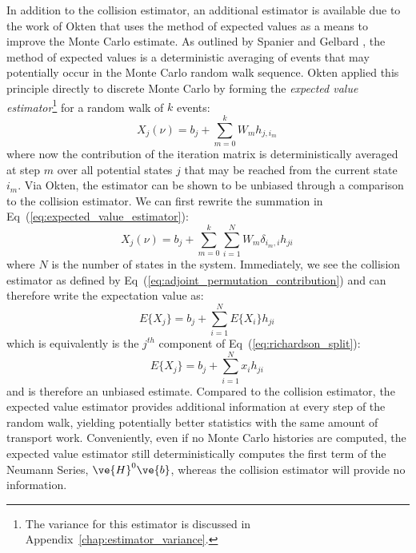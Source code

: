 \documentclass[letterpaper,11pt]{article}
\begin{document}
In addition to the collision estimator, an additional estimator is
available due to the work of Okten \cite{okten_solving_2005} that uses
the method of expected values as a means to improve the Monte Carlo
estimate. As outlined by Spanier and Gelbard
\cite{spanier_monte_1969}, the method of expected values is a
deterministic averaging of events that may potentially occur in the
Monte Carlo random walk sequence. Okten applied this principle
directly to discrete Monte Carlo by forming the \textit{expected value
  estimator}\footnote{The variance for this estimator is discussed in
  Appendix~\ref{chap:estimator_variance}.} for a random walk of $k$
events:
\begin{equation}
  X_{j}(\nu) = b_j + \sum_{m=0}^k W_m h_{j,i_m}\,
  \label{eq:expected_value_estimator}
\end{equation}
where now the contribution of the iteration matrix is
deterministically averaged at step $m$ over all potential states $j$
that may be reached from the current state $i_m$. Via Okten, the
estimator can be shown to be unbiased through a comparison to the
collision estimator. We can first rewrite the summation in
Eq~(\ref{eq:expected_value_estimator}):
\begin{equation}
  X_{j}(\nu) = b_j + \sum_{m=0}^k \sum_{i=1}^N W_m
  \delta_{i_m,i} h_{ji}\,
  \label{eq:unbiased_eval_1}
\end{equation}
where $N$ is the number of states in the system. Immediately, we see
the collision estimator as defined by
Eq~(\ref{eq:adjoint_permutation_contribution}) and can therefore write
the expectation value as:
\begin{equation}
  E\{X_{j}\} = b_j + \sum_{i=1}^N E\{X_{i}\} h_{ji}\,
  \label{eq:unbiased_eval_2}
\end{equation}
which is equivalently is the $j^{th}$ component of
Eq~(\ref{eq:richardson_split}):
\begin{equation}
  E\{X_{j}\} = b_j + \sum_{i=1}^N x_{i} h_{ji}\,
  \label{eq:unbiased_eval_2}
\end{equation}
and is therefore an unbiased estimate. Compared to the collision
estimator, the expected value estimator provides additional
information at every step of the random walk, yielding potentially
better statistics with the same amount of transport
work. Conveniently, even if no Monte Carlo histories are computed, the
expected value estimator still deterministically computes the first
term of the Neumann Series, $\ve{H}^0\ve{b}$, whereas the collision
estimator will provide no information.
\end{document}

